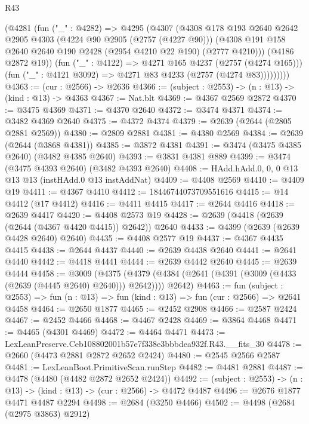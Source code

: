 \begin{lexlean}{R43}
\begin{coremodule}
            (@4281
              (fun ("_" : @4282) =>
              @4295
                (@4307
                  (@4308
                    @178
                    @193
                    @2640
                    @2642
                    @2905
                    @4303
                    (@4224 @90 @2905 (@2757 (@4227 @90)))
                    (@4308 @191 @158 @2640 @2640 @190 @2428 (@2954 @4210 @22 @190) (@2777 @4210)))
                  (@4186 @2872 @19))
                (fun ("_" : @4122) => @4271 @165 @4237 (@2757 (@4274 @165)))
                (fun ("_" : @4121 @3092) => @4271 @83 @4233 (@2757 (@4274 @83)))))))))
@4363 := (cur : @2566) -> @2636
@4366 := (subject : @2553) -> (n : @13) -> (kind : @13) -> @4363
@4367 := Nat.blt
@4369 := @4367 @2569 @2872
@4370 := @3475 @4369
@4371 := @4370 @2640
@4372 := @3474 @4371
@4374 := @3482 @4369 @2640
@4375 := @4372 @4374
@4379 := @2639 (@2644 (@2805 @2881 @2569))
@4380 := @2809 @2881
@4381 := @4380 @2569
@4384 := @2639 (@2644 (@3868 @4381))
@4385 := @3872 @4381
@4391 := @3474 (@3475 @4385 @2640) (@3482 @4385 @2640)
@4393 := @3831 @4381 @889
@4399 := @3474 (@3475 @4393 @2640) (@3482 @4393 @2640)
@4408 := HAdd.hAdd.{0, 0, 0} @13 @13 @13 (instHAdd.{0} @13 instAddNat)
@4409 := @4408 @2569
@4410 := @4409 @19
@4411 := @4367 @4410
@4412 := 18446744073709551616
@4415 := @14 @4412 (@17 @4412)
@4416 := @4411 @4415
@4417 := @2644 @4416
@4418 := @2639 @4417
@4420 := @4408 @2573 @19
@4428 := @2639 (@4418 (@2639 (@2644 (@4367 @4420 @4415)) @2642)) @2640
@4433 := @4399 (@2639 (@2639 @4428 @2640) @2640)
@4435 := @4408 @2577 @19
@4437 := @4367 @4435 @4415
@4438 := @2644 @4437
@4440 := @2639 @4438 @2640
@4441 := @2641 @4440
@4442 := @4418 @4441
@4444 := @2639 @4442 @2640
@4445 := @2639 @4444
@4458 := @3009
    (@4375 (@4379 (@4384 (@2641 (@4391 (@3009 (@4433 (@2639 (@4445 @2640) @2640))) @2642)))) @2642)
@4463 := fun (subject : @2553) =>
  fun (n : @13) => fun (kind : @13) => fun (cur : @2566) => @2641 @4458
@4464 := @2650 @1877
@4465 := @2452 @2908
@4466 := @2587 @2424
@4467 := @2452 @4466
@4468 := @4467 @2428
@4469 := @3864 @4468
@4471 := @4465 (@4301 @4469)
@4472 := @4464 @4471
@4473 := LexLeanPreserve.Ceb108802001b57e7f338e3bbbdea932f.R43.__fits_30
@4478 := @2660 (@4473 @2881 @2872 @2652 @2424)
@4480 := @2545 @2566 @2587
@4481 := LexLeanBoot.PrimitiveScan.runStep
@4482 := @4481 @2881
@4487 := @4478 (@4480 (@4482 @2872 @2652 @2424))
@4492 := (subject : @2553) -> (n : @13) -> (kind : @13) -> (cur : @2566) -> @4472 @4487
@4496 := @2676 @1877 @4471 @4487 @2294
@4498 := @2684 (@3250 @4466)
@4502 := @4498 (@2684 (@2975 @3863) @2912)

\end{coremodule}
\end{lexlean}

